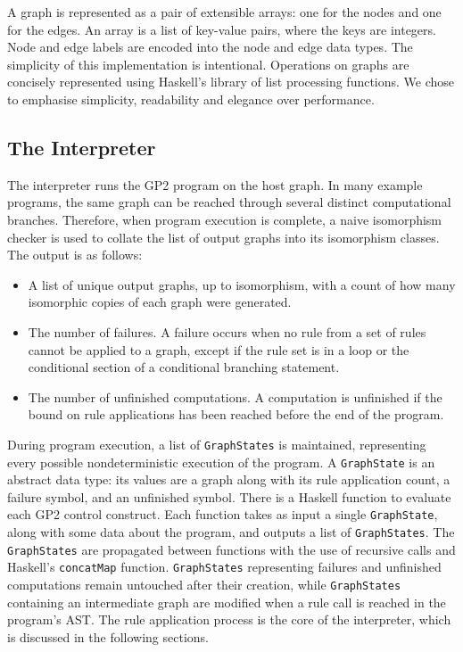 A graph is represented as a pair of extensible arrays: one for the nodes and one for the edges. An array is a list of key-value pairs, where the keys are integers. Node and edge labels are encoded into the node and edge data types. The simplicity of this implementation is intentional. Operations on graphs are concisely represented using Haskell's library of list processing functions. We chose to emphasise simplicity, readability and elegance over performance.

\subsection{The Interpreter}

The interpreter runs the GP2 program on the host graph. In many example programs, the same graph can be reached through several distinct computational branches. Therefore, when program execution is complete, a naive isomorphism checker is used to collate the list of output graphs into its isomorphism classes. The output is as follows:

\begin{itemize}
\item A list of unique output graphs, up to isomorphism, with a count of how many isomorphic copies of each graph were generated.
\item The number of failures. A failure occurs when no rule from a set of rules cannot be applied to a graph, except if the rule set is in a loop or the conditional section of a conditional branching statement.
\item The number of unfinished computations. A computation is unfinished if the bound on rule applications has been reached before the end of the program.
\end{itemize}

During program execution, a list of \texttt{GraphStates} is maintained, representing every possible nondeterministic execution of the program. A \texttt{GraphState} is an abstract data type: its values are a graph along with its rule application count, a failure symbol, and an unfinished symbol. There is a Haskell function to evaluate each GP2 control construct. Each function takes as input a single \texttt{GraphState}, along with some data about the program, and outputs a list of \texttt{GraphStates}. The \texttt{GraphStates} are propagated between functions with the use of recursive calls and Haskell's \texttt{concatMap} function. \texttt{GraphStates} representing failures and unfinished computations remain untouched after their creation, while \texttt{GraphStates} containing an intermediate graph are modified when a rule call is reached in the program's AST. The rule application process is the core of the interpreter, which is discussed in the following sections.


